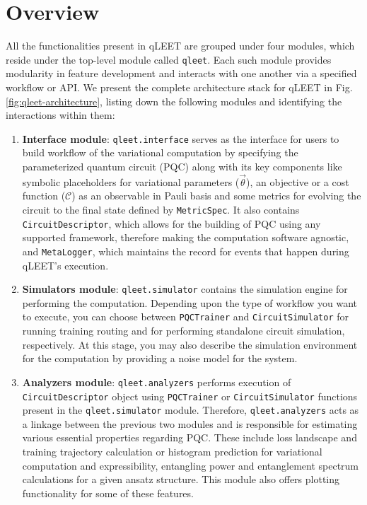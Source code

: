 \documentclass[%
 reprint,
 amsmath,
 amssymb,
 showkeys,
 pra,
 floatfix,
]{revtex4-2}
\begin{document}
\section{\label{sec:overview}Overview}

All the functionalities present in qLEET are grouped under four modules, which reside under the top-level module called \texttt{qleet}. Each such module provides modularity in feature development and interacts with one another via a specified workflow or API. We present the complete architecture stack for qLEET in Fig. \ref{fig:qleet-architecture}, listing down the following modules and identifying the interactions within them:

\begin{enumerate}

	\item \textbf{Interface module}: \texttt{qleet.interface} serves as the interface for users to build workflow of the variational computation by specifying the parameterized quantum circuit (PQC) along with its key components like symbolic placeholders for variational parameters ($\vec{\theta}$), an objective or a cost function ($\mathcal{C}$) as an observable in Pauli basis and some metrics for evolving the circuit to the final state defined by \texttt{MetricSpec}. It also contains \texttt{CircuitDescriptor}, which allows for the building of PQC using any supported framework, therefore making the computation software agnostic, and \texttt{MetaLogger}, which maintains the record for events that happen during qLEET's execution. 

	\item \textbf{Simulators module}: \texttt{qleet.simulator} contains the  simulation engine for performing the computation. Depending upon the type of workflow you want to execute, you can choose between \texttt{PQCTrainer} and \texttt{CircuitSimulator} for running training routing and for performing standalone circuit simulation, respectively. At this stage, you may also describe the simulation environment for the computation by providing a noise model for the system. 

	\item \textbf{Analyzers module}: \texttt{qleet.analyzers} performs execution of \texttt{CircuitDescriptor} object using \texttt{PQCTrainer} or \texttt{CircuitSimulator} functions present in the \texttt{qleet.simulator} module. Therefore, \texttt{qleet.analyzers} acts as a linkage between the previous two modules and is responsible for estimating various essential properties regarding PQC. These include loss landscape and training trajectory calculation or histogram prediction for variational computation and expressibility, entangling power and entanglement spectrum calculations for a given ansatz structure. This module also offers plotting functionality for some of these features.
	

\end{enumerate}
\end{document}
